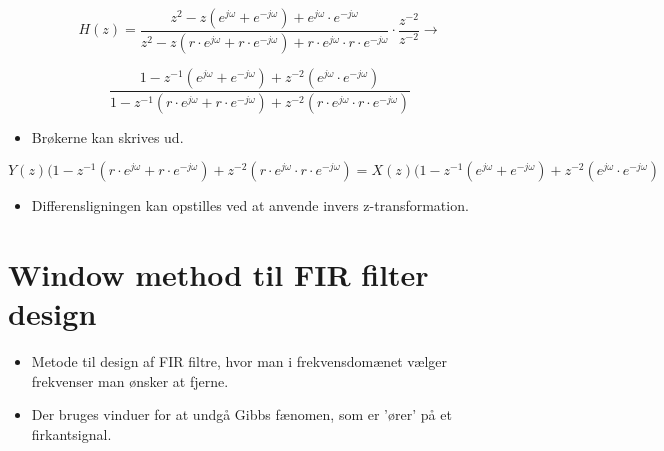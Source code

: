 \documentclass[danish]{article}
\begin{document}
\begin{equation}
H(z) = \frac{z^2 - z(e^{j\omega}+e^{-j\omega}) + e^{j\omega}\cdot e^{-j\omega}}{z^2 - z(r\cdot e^{j\omega}+r\cdot e^{-j\omega}) + r\cdot e^{j\omega}\cdot r\cdot e^{-j\omega}} \cdot \frac{z^{-2}}{z^{-2}} \longrightarrow 
\end{equation}

\begin{equation}
\frac{1 - z^{-1}(e^{j\omega}+e^{-j\omega}) + z^{-2}(e^{j\omega}\cdot e^{-j\omega})}{1 - z^{-1}(r\cdot e^{j\omega}+r\cdot e^{-j\omega}) + z^{-2}(r\cdot e^{j\omega}\cdot r\cdot e^{-j\omega})}
\end{equation}

\begin{itemize}
	\item Brøkerne kan skrives ud.
\end{itemize}

\begin{equation}
Y(z)(1-z^{-1}(r\cdot e^{j\omega}+r\cdot e^{-j\omega})+z^{-2}(r\cdot e^{j\omega}\cdot r\cdot e^{-j\omega}) = X(z)(1-z^{-1}(e^{j\omega}+e^{-j\omega})+z^{-2}(e^{j\omega}\cdot e^{-j\omega})
\end{equation}

\begin{itemize}
	\item Differensligningen kan opstilles ved at anvende invers z-transformation.
\end{itemize}





\newpage
\section{Window method til FIR filter design}

\begin{itemize}
	\item Metode til design af FIR filtre, hvor man i frekvensdomænet vælger frekvenser man ønsker at fjerne.
	\item Der bruges vinduer for at undgå Gibbs fænomen, som er 'ører' på et firkantsignal.
\end{itemize}
\end{document}
